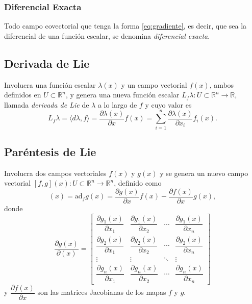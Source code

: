 \subsubsection{Diferencial Exacta}
Todo campo covectorial que tenga la forma \eqref{eq:gradiente}, es decir, que sea la diferencial de una función escalar, se denomina \textit{diferencial exacta}.

\subsection{Derivada de Lie}
Involucra una función escalar $\lambda(x)$ y un campo vectorial $f(x)$, ambos definidos en $U\subset \mathbb{R}^n$, y genera una nueva función escalar $L_f \lambda : U \subset \mathbb{R}^n \rightarrow \mathbb{R}$, llamada \textit{derivada de Lie} de $\lambda$ a lo largo de $f$ y cuyo valor es
\begin{equation*}
	L_f \lambda = \langle d\lambda, f \rangle = \dfrac{\partial \lambda(x)}{\partial x} f(x) = \sum_{i=1}^n \dfrac{\partial \lambda(x)}{\partial x_i} f_i(x).
\end{equation*}

\subsection{Paréntesis de Lie}
Involucra dos campos vectoriales $f(x)$ y $g(x)$ y se genera un nuevo campo vectorial $[f,g](x): U \subset \mathbb{R}^n \rightarrow \mathbb{R}^n$, definido como
\begin{equation*}
	[f,g](x) = \text{ad}_f g(x) = \dfrac{\partial g(x)}{\partial x} f(x) - \dfrac{\partial f(x)}{\partial x} g(x),
\end{equation*}
donde
\begin{equation*}
	\dfrac{\partial g(x)}{\partial (x)} = \begin{bmatrix}
		\dfrac{\partial g_1(x)}{\partial x_1} & \dfrac{\partial g_1(x)}{\partial x_2} & \cdots & \dfrac{\partial g_1(x)}{\partial x_n} \\
		\dfrac{\partial g_2(x)}{\partial x_1} & \dfrac{\partial g_2(x)}{\partial x_2} & \cdots & \dfrac{\partial g_2(x)}{\partial x_n} \\
		\vdots                                & \vdots                                & \ddots & \vdots                                \\
		\dfrac{\partial g_n(x)}{\partial x_1} & \dfrac{\partial g_n(x)}{\partial x_2} & \cdots & \dfrac{\partial g_n(x)}{\partial x_n}
	\end{bmatrix}
\end{equation*}
y $\dfrac{\partial f(x)}{\partial x}$ son las matrices Jacobianas de los mapas $f$ y $g$.

